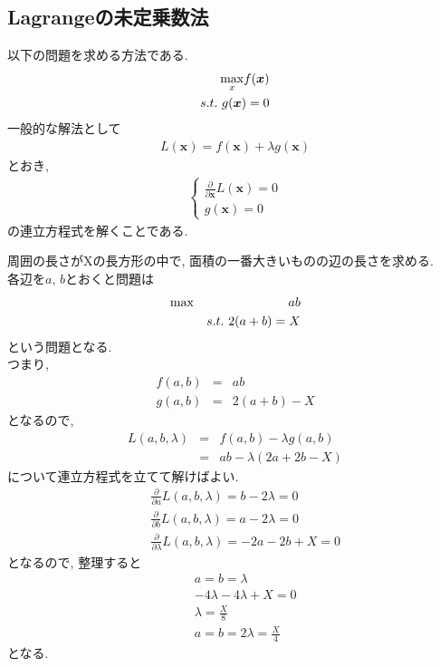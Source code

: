 \documentclass[dvipdfmx,a4j]{jsarticle}
\begin{document}
  \subsection{Lagrangeの未定乗数法}
  以下の問題を求める方法である.
  \begin{eqnarray*}
    \underset{x}{\rm max}f(\bm{x})\\
    s.t.\ g(\bm{x})=0
  \end{eqnarray*}
  一般的な解法として
  \begin{align*}
   L(\bm{x})=f(\bm{x})+\lambda g(\bm{x}) \tag{6.1}
  \end{align*}
  とおき,
  \begin{eqnarray*}
    \left\{
    \begin{array}{l}
      \displaystyle \frac{\partial}{\partial \bm{x}}L(\bm{x}) = 0\\
      g(\bm{x})=0
    \end{array}
    \right.
  \end{eqnarray*}
  の連立方程式を解くことである.\\
  \begin{screen}
    周囲の長さがXの長方形の中で, 面積の一番大きいものの辺の長さを求める.\\
    各辺を$a,\,b$とおくと問題は
    \begin{eqnarray*}
      {\rm max}&& ab\\
      && s.t.\ 2(a+b)=X
    \end{eqnarray*}
    という問題となる.\\
    つまり, \\
    \begin{eqnarray*}
      f(a,b) &=& ab\\
      g(a,b) &=& 2(a+b)-X
    \end{eqnarray*}
    となるので,
    \begin{eqnarray*}
      L(a,b,\lambda) &=& f(a,b)- \lambda g(a,b)\\
                     &=& ab - \lambda (2a+2b-X)
    \end{eqnarray*}
    について連立方程式を立てて解けばよい.
    \begin{eqnarray*}
      && \frac{\partial}{\partial a} L (a,b,\lambda) = b-2\lambda = 0\\
      && \frac{\partial}{\partial b} L (a,b,\lambda) = a-2\lambda = 0\\
      && \frac{\partial}{\partial \lambda} L(a,b,\lambda) = -2a-2b+X = 0
    \end{eqnarray*}
    となるので, 整理すると
    \begin{eqnarray*}
      && a = b = \lambda\\
      && -4\lambda-4\lambda+X = 0\\
      && \lambda = \frac{X}{8}\\
      && a=b=2\lambda = \frac{X}{4}
    \end{eqnarray*}
    となる.
  \end{screen}
\end{document}
